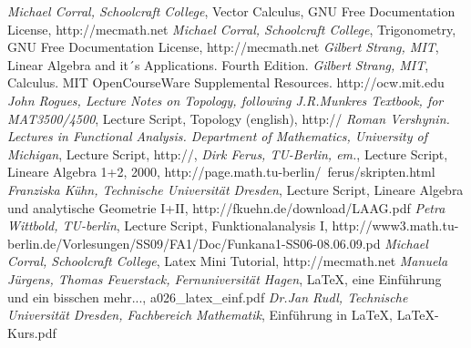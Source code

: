 \documentclass[a4paper]{article}
\begin{document}
\begin{thebibliography}
    \textit{Michael Corral, Schoolcraft College},
        Vector Calculus, GNU Free Documentation License, http://mecmath.net
     \textit{Michael Corral, Schoolcraft College},
        Trigonometry, GNU Free Documentation License, http://mecmath.net 
     \textit{Gilbert Strang, MIT},
            Linear Algebra and it´s Applications. Fourth Edition.        
     \textit{Gilbert Strang, MIT},
            Calculus. MIT OpenCourseWare Supplemental Resources. http://ocw.mit.edu    
     \textit{John Rogues, Lecture Notes on Topology, following J.R.Munkres Textbook, for MAT3500/4500},
            Lecture Script, Topology (english), http://
     \textit{Roman Vershynin. Lectures in Functional Analysis. Department of Mathematics, University of Michigan},
            Lecture Script, http://,        
     \textit{Dirk Ferus, TU-Berlin, em.},
            Lecture Script, Lineare Algebra 1+2, 2000, http://page.math.tu-berlin/~ferus/skripten.html
     \textit{Franziska K\"uhn, Technische Universit\"at Dresden},
            Lecture Script, Lineare Algebra und analytische Geometrie I+II, http://fkuehn.de/download/LAAG.pdf
     \textit{Petra Wittbold, TU-berlin},  
            Lecture Script, Funktionalanalysis I,  http://www3.math.tu-berlin.de/Vorlesungen/SS09/FA1/Doc/Funkana1-SS06-08.06.09.pd
     \textit{Michael Corral, Schoolcraft College},
            Latex Mini Tutorial, http://mecmath.net                    
     \textit{Manuela J\"urgens, Thomas Feuerstack, Fernuniversit\"at Hagen},
            LaTeX, eine Einf\"uhrung und ein bisschen mehr..., a026\_latex\_einf.pdf            
     \textit{Dr.Jan Rudl, Technische Universit\"at Dresden, Fachbereich Mathematik},
            Einf\"uhrung in LaTeX, LaTeX-Kurs.pdf

            \end{thebibliography}




\printindex
\end{document}
